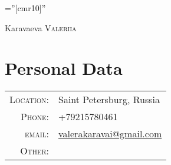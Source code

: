\documentclass[a4paper,10pt]{article}
\begin{document}

\pagestyle{empty} %

\font\fb=''[cmr10]'' %


\par{

		{\Huge Karavaeva \textsc{Valeriia}
	}\hspace{4cm}
\par} 


\section{Personal Data}

\begin{tabular}{rl}
    \textsc{Location:} & Saint Petersburg, Russia \\
    \textsc{Phone:}     & +79215780461\\
    \textsc{email:}     & \href{mailto:valerakaravai@gmail.com}{valerakaravai@gmail.com} \\
    \textsc{Other:}     &
\href{https://www.linkedin.com/in/valeriya-karavaeva/}{\ci{\faLinkedin}}
\href{https://github.com/ValeraKaravai}{\ci{\faGithub}}
\href{https://join.skype.com/invite/mHExCQKPdCGJ}{\ci{\faSkype}}
\end{tabular}

\end{document}
